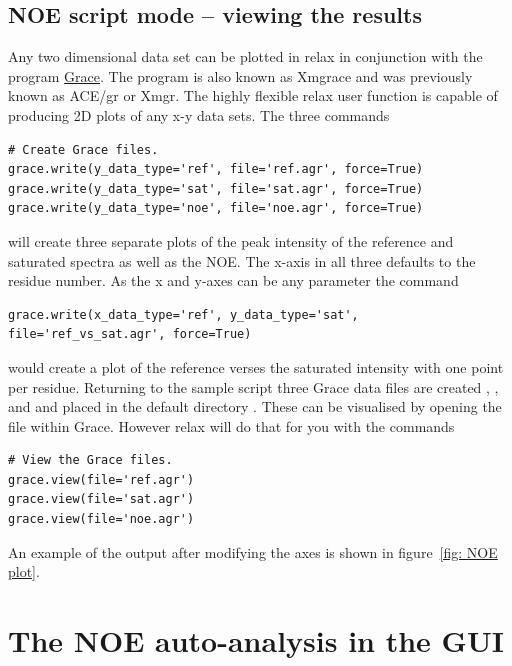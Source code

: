 \subsection{NOE script mode -- viewing the results}

Any two dimensional data set can be plotted in relax in conjunction with the program \href{http://plasma-gate.weizmann.ac.il/Grace/}{Grace}.  The program is also known as Xmgrace and was previously known as ACE/gr or Xmgr.  The highly flexible relax user function  is capable of producing 2D plots of any x-y data sets.  The three commands

\begin{lstlisting}[firstnumber=41]
# Create Grace files.
grace.write(y_data_type='ref', file='ref.agr', force=True)
grace.write(y_data_type='sat', file='sat.agr', force=True)
grace.write(y_data_type='noe', file='noe.agr', force=True)
\end{lstlisting}

will create three separate plots of the peak intensity of the reference and saturated spectra as well as the NOE.  The x-axis in all three defaults to the residue number.  As the x and y-axes can be any parameter the command

\begin{lstlisting}[numbers=none]
grace.write(x_data_type='ref', y_data_type='sat', file='ref_vs_sat.agr', force=True)
\end{lstlisting}

would create a plot of the reference verses the saturated intensity with one point per residue.  Returning to the sample script three Grace data files are created , , and  and placed in the default directory .  These can be visualised by opening the file within Grace.  However relax will do that for you with the commands

\begin{lstlisting}[firstnumber=46]
# View the Grace files.
grace.view(file='ref.agr')
grace.view(file='sat.agr')
grace.view(file='noe.agr')
\end{lstlisting}

An example of the output after modifying the axes is shown in figure~\ref{fig: NOE plot}.



\newpage
\section{The NOE auto-analysis in the GUI}

